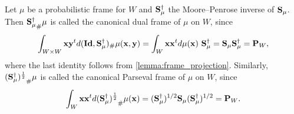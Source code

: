 \documentclass{amsart}
\numberwithin{equation}{section}
\newcommand{\bP}{{\mathbf P}}
\theoremstyle{plain}
\theoremstyle{remark}
\theoremstyle{definition}
\begin{document}
Let $\mu$ be a probabilistic frame for $W$ and ${\bf S}_{\mu}^\dagger$ the Moore–Penrose inverse of ${\bf S}_{\mu}$. Then ${{\bf S}_{\mu}^\dagger}_\#\mu$ is called the canonical dual frame of $\mu$ on $W$, since 
\begin{equation*}
    \int_{W \times W} {\bf x}{\bf y}^t d(\mathbf{Id}, {\bf S}_{\mu}^\dagger)_\#\mu({\bf x,y}) = \int_{W} {\bf x}{\bf x}^t d\mu({\bf x}) \ {\bf S}_{\mu}^\dagger = {\bf S}_{\mu} {\bf S}_{\mu}^\dagger= \bP_W,
\end{equation*}
where the last identity follows from \cref{lemma:frame_projection}.
Similarly,  ${({\bf S}_{\mu}^\dagger)^{\frac{1}{2}}}_\#\mu$ is called the canonical Parseval  frame of $\mu$ on $W$, since
\begin{equation*}
    \int_{W} {\bf x}{\bf x}^t d{({\bf S}_{\mu}^\dagger)^{\frac{1}{2}}}_\#\mu({\bf x}) =({\bf S}_{\mu}^\dagger)^{1/2} {\bf S}_{\mu}  ({\bf S}_{\mu}^\dagger)^{1/2}= \bP_W.
\end{equation*}
\end{document}
